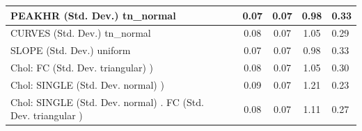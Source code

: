 \begin{table}
\begin{center}
\begin{tabular}{|l|l|c|c|c|l|}
			\hline
			PEAKHR (Std. Dev.) tn_normal &  & 0.07 & 0.07 & 0.98 & 0.33 \\
			\hline
			CURVES (Std. Dev.) tn_normal &  & 0.08 & 0.07 & 1.05 & 0.29 \\
			\hline
			SLOPE (Std. Dev.) uniform &  & 0.07 & 0.07 & 0.98 & 0.33 \\
			\hline
			 Chol: FC (Std. Dev. triangular) ) &  & 0.08 & 0.07 & 1.05 & 0.30 \\
			\hline
			 Chol: SINGLE (Std. Dev. normal) ) &  & 0.09 & 0.07 & 1.21 & 0.23 \\
			\hline
			 Chol: SINGLE (Std. Dev. normal) . FC (Std. Dev.   triangular ) &  & 0.08 & 0.07 & 1.11 & 0.27 \\
			\hline
		\end{tabular}
	\end{center}
\end{table}